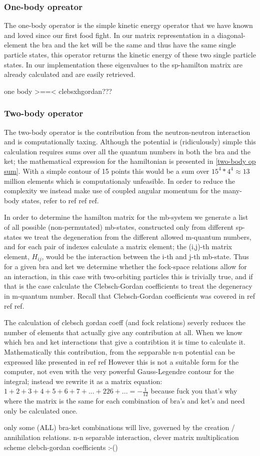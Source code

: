 \documentclass[12pt,a4paper]{article}
\begin{document}
\subsubsection{One-body opreator}
The one-body operator is the simple kinetic energy operator that we have known and loved since our first food fight. 
In our matrix representation in a diagonal-element the bra and the ket will be the same and thus have the same single particle states, this operator returns the kinetic energy of these two single particle states. 
In our implementation these eigenvalues to the sp-hamilton matrix are already calculated and are easily retrieved.

one body >==< clebsxhgordan???
\subsubsection{Two-body operator}
The two-body operator is the contribution from the neutron-neutron interaction and is computationally taxing. Although the potential is (ridiculously) simple this calculation requires sums over all the quantum numbers in both the bra and the ket; the mathematical expression for the hamiltonian is presented in \ref{two-body op sum}. 
With a simple contour of 15 points this would be a sum over $15^4*4^4 \approx 13$ million elements which is computationaly unfeasible.
In order to reduce the complexity we instead make use of coupled angular momentum for the many-body states, refer to ref ref ref.

In order to determine the hamilton matrix for the mb-system we generate a list of all possible (non-permutated) mb-states, constructed only from different sp-states we treat the degeneration from the different allowed m-quantum numbers, and for each pair of indexes calculate a matrix element; the (i,j)-th matrix element, $H_{ij}$, would be the interaction between the i-th and j-th mb-state. 
Thus for a given bra and ket we determine whether the fock-space relations allow for an interaction, in this case with two-orbiting particles this is trivially true, and if that is the case calculate the Clebsch-Gordan coefficients to treat the degeneracy in m-quantum number. 
Recall that Clebsch-Gordan coefficients was covered in ref ref ref.

The calculation of clebsch gordan coeff (and fock relations) severly reduces the number of elements that actually give any contribution at all. 
When we know which bra and ket interactions that give a contribtion it is time to calculate it. 
Mathematically this contribution, from the sepparable n-n potential can be expressed like presented in ref ref
However this is not a suitable form for the computer, not even with the very powerful Gauss-Legendre contour for the integral; instead we rewrite it as a matrix equation:
$1+2+3+4+5+6+7+...+226+... = - \frac{1}{12}$ because fuck you that's why\\
where the matrix is the same for each combination of bra's and ket's and need only be calculated once.

only some (ALL) bra-ket combinations will live, governed by the creation / annihilation relations. 
n-n separable interaction, clever matrix multiplication scheme
clebch-gordan coefficients :-()
\end{document}

